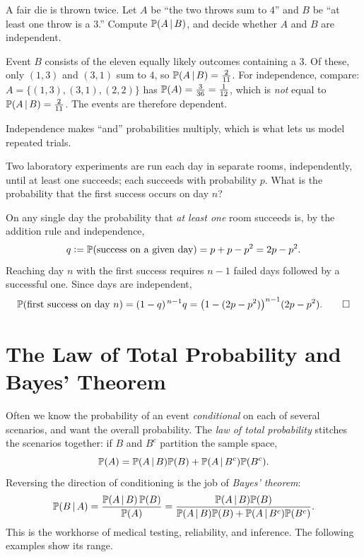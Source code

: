 \begin{example}
A fair die is thrown twice. Let $A$ be ``the two throws sum to $4$'' and $B$ be
``at least one throw is a $3$.'' Compute $\mathbb{P}(A\,|\, B)$, and decide whether
$A$ and $B$ are independent.

\solution Event $B$ consists of the eleven equally likely outcomes containing a
$3$. Of these, only $(1,3)$ and $(3,1)$ sum to $4$, so
$\mathbb{P}(A\,|\, B)=\tfrac{2}{11}$. For independence, compare: $A=\{(1,3),(3,1),(2,2)\}$
has $\mathbb{P}(A)=\tfrac{3}{36}=\tfrac1{12}$, which is \emph{not} equal to
$\mathbb{P}(A\,|\, B)=\tfrac2{11}$. The events are therefore dependent.
\end{example}

Independence makes ``and'' probabilities multiply, which is what lets us model
repeated trials.

\begin{example}
Two laboratory experiments are run each day in separate rooms, independently,
until at least one succeeds; each succeeds with probability $p$. What is the
probability that the first success occurs on day $n$?

\solution On any single day the probability that \emph{at least one} room
succeeds is, by the addition rule and independence,
\[
  q \vcentcolon= \mathbb{P}(\text{success on a given day}) = p+p-p^2 = 2p-p^2.
\]
Reaching day $n$ with the first success requires $n-1$ failed days followed by a
successful one. Since days are independent,
\[
  \mathbb{P}(\text{first success on day }n) = (1-q)^{\,n-1}q
   = \bigl(1-(2p-p^2)\bigr)^{n-1}(2p-p^2). \qedhere
\]
\end{example}

\section{The Law of Total Probability and Bayes' Theorem}

Often we know the probability of an event \emph{conditional} on each of several
scenarios, and want the overall probability. The \emph{law of total
probability} stitches the scenarios together: if $B$ and $B^c$ partition the
sample space,
\[
  \mathbb{P}(A)=\mathbb{P}(A\,|\, B)\mathbb{P}(B)+\mathbb{P}(A\,|\, B^c)\mathbb{P}(B^c).
\]
Reversing the direction of conditioning is the job of \emph{Bayes' theorem}:
\[
  \mathbb{P}(B\,|\, A)=\frac{\mathbb{P}(A\,|\, B)\,\mathbb{P}(B)}{\mathbb{P}(A)}
   =\frac{\mathbb{P}(A\,|\, B)\mathbb{P}(B)}{\mathbb{P}(A\,|\, B)\mathbb{P}(B)+\mathbb{P}(A\,|\, B^c)\mathbb{P}(B^c)}.
\]
This is the workhorse of medical testing, reliability, and inference. The
following examples show its range.

